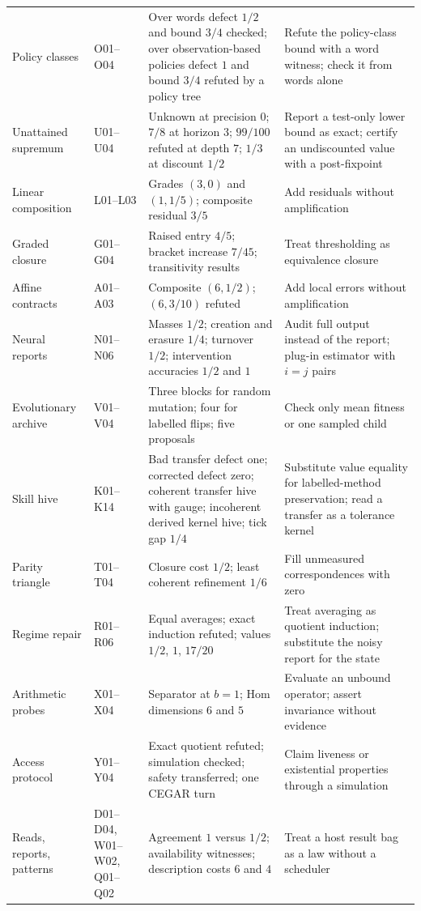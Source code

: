 \documentclass[11pt]{article}
\theoremstyle{definition}
\theoremstyle{plain}
\begin{document}
{\begin{longtable}{>{\raggedright\arraybackslash}p{2.6cm}>{\raggedright\arraybackslash}p{1.5cm}>{\raggedright\arraybackslash}p{5.4cm}>{\raggedright\arraybackslash}p{4.2cm}}
Policy classes & O01--O04 & Over words defect $1/2$ and bound $3/4$ checked; over observation-based policies defect $1$ and bound $3/4$ refuted by a policy tree & Refute the policy-class bound with a word witness; check it from words alone\\
Unattained supremum & U01--U04 & Unknown at precision $0$; $7/8$ at horizon $3$; $99/100$ refuted at depth $7$; $1/3$ at discount $1/2$ & Report a test-only lower bound as exact; certify an undiscounted value with a post-fixpoint\\
Linear composition & L01--L03 & Grades $(3,0)$ and $(1,1/5)$; composite residual $3/5$ & Add residuals without amplification\\
Graded closure & G01--G04 & Raised entry $4/5$; bracket increase $7/45$; transitivity results & Treat thresholding as equivalence closure\\
Affine contracts & A01--A03 & Composite $(6,1/2)$; $(6,3/10)$ refuted & Add local errors without amplification\\
Neural reports & N01--N06 & Masses $1/2$; creation and erasure $1/4$; turnover $1/2$; intervention accuracies $1/2$ and $1$ & Audit full output instead of the report; plug-in estimator with $i=j$ pairs\\
Evolutionary archive & V01--V04 & Three blocks for random mutation; four for labelled flips; five proposals & Check only mean fitness or one sampled child\\
Skill hive & K01--K14 & Bad transfer defect one; corrected defect zero; coherent transfer hive with gauge; incoherent derived kernel hive; tick gap $1/4$ & Substitute value equality for labelled-method preservation; read a transfer as a tolerance kernel\\
Parity triangle & T01--T04 & Closure cost $1/2$; least coherent refinement $1/6$ & Fill unmeasured correspondences with zero\\
Regime repair & R01--R06 & Equal averages; exact induction refuted; values $1/2$, $1$, $17/20$ & Treat averaging as quotient induction; substitute the noisy report for the state\\
Arithmetic probes & X01--X04 & Separator at $b=1$; Hom dimensions $6$ and $5$ & Evaluate an unbound operator; assert invariance without evidence\\
Access protocol & Y01--Y04 & Exact quotient refuted; simulation checked; safety transferred; one CEGAR turn & Claim liveness or existential properties through a simulation\\
Reads, reports, patterns & D01--D04, W01--W02, Q01--Q02 & Agreement $1$ versus $1/2$; availability witnesses; description costs $6$ and $4$ & Treat a host result bag as a law without a scheduler\\

\end{longtable}}
\end{document}
